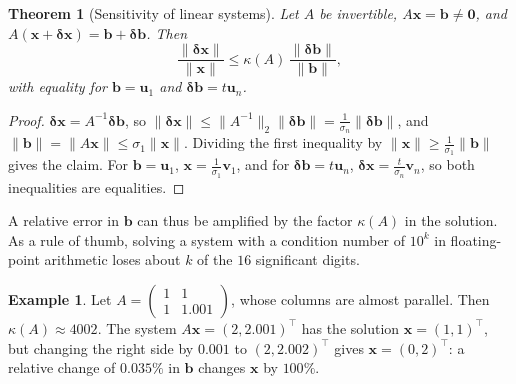 \documentclass[11pt]{article}
\newcommand{\norm}[1]{\lVert #1 \rVert}
\theoremstyle{definition}
\newtheorem{example}[definition]{Example}
\theoremstyle{plain}
\newtheorem{theorem}[definition]{Theorem}
\theoremstyle{remark}
\begin{document}
\begin{theorem}[Sensitivity of linear systems]\label{thm:condition}
    Let $A$ be invertible, $A\mathbf{x} = \mathbf{b} \neq \mathbf{0}$, and $A(\mathbf{x} + \boldsymbol{\delta}\mathbf{x}) = \mathbf{b} + \boldsymbol{\delta}\mathbf{b}$. Then
    \[\frac{\norm{\boldsymbol{\delta}\mathbf{x}}}{\norm{\mathbf{x}}} \leq \kappa(A)\,\frac{\norm{\boldsymbol{\delta}\mathbf{b}}}{\norm{\mathbf{b}}},\]
    with equality for $\mathbf{b} = \mathbf{u}_1$ and $\boldsymbol{\delta}\mathbf{b} = t\mathbf{u}_n$.
\end{theorem}

\begin{proof}
    $\boldsymbol{\delta}\mathbf{x} = A^{-1}\boldsymbol{\delta}\mathbf{b}$, so $\norm{\boldsymbol{\delta}\mathbf{x}} \leq \norm{A^{-1}}_2\norm{\boldsymbol{\delta}\mathbf{b}} = \frac{1}{\sigma_n}\norm{\boldsymbol{\delta}\mathbf{b}}$, and $\norm{\mathbf{b}} = \norm{A\mathbf{x}} \leq \sigma_1\norm{\mathbf{x}}$. Dividing the first inequality by $\norm{\mathbf{x}} \geq \frac{1}{\sigma_1}\norm{\mathbf{b}}$ gives the claim. For $\mathbf{b} = \mathbf{u}_1$, $\mathbf{x} = \frac{1}{\sigma_1}\mathbf{v}_1$, and for $\boldsymbol{\delta}\mathbf{b} = t\mathbf{u}_n$, $\boldsymbol{\delta}\mathbf{x} = \frac{t}{\sigma_n}\mathbf{v}_n$, so both inequalities are equalities.
\end{proof}

A relative error in $\mathbf{b}$ can thus be amplified by the factor $\kappa(A)$ in the solution. As a rule of thumb, solving a system with a condition number of $10^k$ in floating-point arithmetic loses about $k$ of the $16$ significant digits.

\begin{example}\label{ex:ill-conditioned}
    Let $A = \begin{pmatrix} 1 & 1 \\ 1 & 1.001 \end{pmatrix}$, whose columns are almost parallel. Then $\kappa(A) \approx 4002$. The system $A\mathbf{x} = (2, 2.001)^\top$ has the solution $\mathbf{x} = (1, 1)^\top$, but changing the right side by $0.001$ to $(2, 2.002)^\top$ gives $\mathbf{x} = (0, 2)^\top$: a relative change of $0.035\%$ in $\mathbf{b}$ changes $\mathbf{x}$ by $100\%$.
\end{example}
\end{document}
